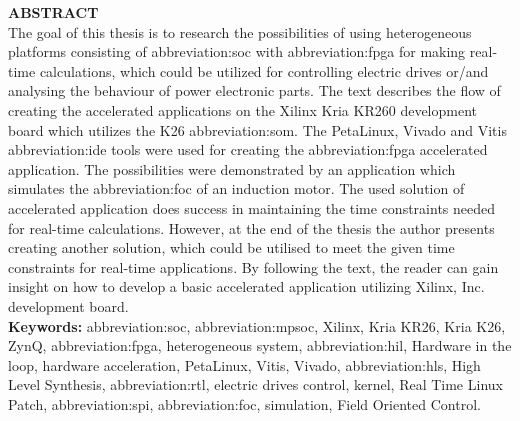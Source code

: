 \documentclass[a4paper, twoside, 11pt]{article}
\begin{document}
\begin{minipage}[t]{7.37cm}
		\textcolor{ctublue}{\Large{\textbf{\MakeTextUppercase{Abstract}}}}\\
		The goal of this thesis is to research the possibilities of using heterogeneous platforms consisting of \gls{abbreviation:soc} with \gls{abbreviation:fpga} for making real-time calculations, which could be utilized for controlling electric drives or/and analysing the behaviour of power electronic parts. The text describes the flow of creating the accelerated applications on the Xilinx Kria KR260 development board which utilizes the K26 \gls{abbreviation:som}. The PetaLinux, Vivado and Vitis \gls{abbreviation:ide} tools were used for creating the \gls{abbreviation:fpga} accelerated application. The possibilities were demonstrated by an application which simulates the \gls{abbreviation:foc} of an induction motor. The used solution of accelerated application does success in maintaining the time constraints needed for real-time calculations. However, at the end of the thesis the author presents creating another solution, which could be utilised to meet the given time constraints for real-time applications. By following the text, the reader can gain insight on how to develop a basic accelerated application utilizing Xilinx, Inc. development board.\\
		\textbf{Keywords:} \gls{abbreviation:soc}, \gls{abbreviation:mpsoc}, Xilinx, Kria KR26, Kria K26, ZynQ, \gls{abbreviation:fpga}, heterogeneous system, \gls{abbreviation:hil}, Hardware in the loop, hardware acceleration, PetaLinux, Vitis, Vivado, \gls{abbreviation:hls}, High Level Synthesis, \gls{abbreviation:rtl}, electric drives control, kernel, Real Time Linux Patch, \gls{abbreviation:spi}, \gls{abbreviation:foc}, simulation, Field Oriented Control.
\end{minipage}


\newpage
\tableofcontents
\newpage%
\flushbottom %
\newpage
\vspace{0pt}
\listoffigures %
\flushbottom %
\newpage
\listoftables
\flushbottom
\newpage


\null\newpage
\setcounter{page}{1}
\end{document}

